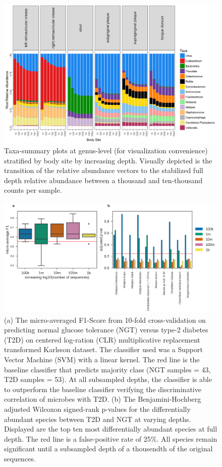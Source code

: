 \begin{figure}[hbt]
    \centering
    \includegraphics[width=0.99\linewidth]{fig/hmp_taxa.png}
    \caption{
        Taxa-summary plots at genus-level (for visualization convenience) stratified by body site by increasing depth. Visually depicted is the transition of the relative abundance vectors to the stabilized full depth relative abundance between a thousand and ten-thousand counts per sample.
    }
    \label{fig:hmp_taxa}
\end{figure}

\begin{figure}[hbt]
    \centering
    \includegraphics[width=0.8\linewidth]{fig/karlsson2013_f1_combined.png}
    \caption{
        (a) The micro-averaged F1-Score from 10-fold cross-validation on predicting normal glucose tolerance (NGT) versus type-2 diabetes (T2D) on centered log-ration (CLR) multiplicative replacement transformed Karlsson dataset. The classifier used was a Support Vector Machine (SVM) with a linear kernel. The red line is the baseline classifier that predicts majority class (NGT samples = 43, T2D samples = 53). At all subsampled depths, the classifier is able to outperform the baseline classifier verifying the discriminative correlation of microbes with T2D. (b) The Benjamini-Hochberg adjusted Wilcoxon signed-rank p-values for the differentially abundant species between T2D and NGT at varying depths. Displayed are the top ten most differentially abundant species at full depth. The red line is a false-positive rate of 25\%. All species remain significant until a subsampled depth of a thousendth of the original sequences.
    }
    \label{fig:karlsson2013_f1_combined}
\end{figure}

